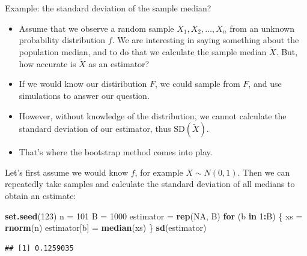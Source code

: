 \documentclass[10pt,ignorenonframetext,]{beamer}
\newenvironment{Shaded}{\begin{snugshade}}{\end{snugshade}}
\newcommand{\KeywordTok}[1]{\textcolor[rgb]{0.13,0.29,0.53}{\textbf{#1}}}
\newcommand{\DecValTok}[1]{\textcolor[rgb]{0.00,0.00,0.81}{#1}}
\newcommand{\StringTok}[1]{\textcolor[rgb]{0.31,0.60,0.02}{#1}}
\newcommand{\OtherTok}[1]{\textcolor[rgb]{0.56,0.35,0.01}{#1}}
\newcommand{\ControlFlowTok}[1]{\textcolor[rgb]{0.13,0.29,0.53}{\textbf{#1}}}
\newcommand{\OperatorTok}[1]{\textcolor[rgb]{0.81,0.36,0.00}{\textbf{#1}}}
\newcommand{\NormalTok}[1]{#1}
\begin{document}
\begin{frame}

\begin{block}{Example: the standard deviation of the sample median?}

\vspace{2mm}

\begin{itemize}
\item
  Assume that we observe a random sample \(X_1, X_2, \ldots, X_n\) from
  an unknown probability distribution \(f\). We are interesting in
  saying something about the population median, and to do that we
  calculate the sample median \(\tilde{X}\). But, how accurate is
  \(\tilde{X}\) as an estimator?
\item
  If we would know our distiribution \(F\), we could sample from \(F\),
  and use simulations to answer our question.
\item
  However, without knowledge of the distribution, we cannot calculate
  the standard deviation of our estimator, thus
  \(\text{SD}(\tilde{X})\).
\item
  That's where the bootstrap method comes into play.
\end{itemize}

\end{block}

\end{frame}

\begin{frame}[fragile]

Let's first assume we would know \(f\), for example \(X\sim N(0,1)\).
Then we can repeatedly take samples and calculate the standard deviation
of all medians to obtain an estimate:

\small

\begin{Shaded}
\begin{Highlighting}[]
\KeywordTok{set.seed}\NormalTok{(}\DecValTok{123}\NormalTok{)}
\NormalTok{n =}\StringTok{ }\DecValTok{101}
\NormalTok{B =}\StringTok{ }\DecValTok{1000}
\NormalTok{estimator =}\StringTok{ }\KeywordTok{rep}\NormalTok{(}\OtherTok{NA}\NormalTok{, B)}
\ControlFlowTok{for}\NormalTok{ (b }\ControlFlowTok{in} \DecValTok{1}\OperatorTok{:}\NormalTok{B) \{}
\NormalTok{    xs =}\StringTok{ }\KeywordTok{rnorm}\NormalTok{(n)}
\NormalTok{    estimator[b] =}\StringTok{ }\KeywordTok{median}\NormalTok{(xs)}
\NormalTok{\}}
\KeywordTok{sd}\NormalTok{(estimator)}
\end{Highlighting}
\end{Shaded}

\begin{verbatim}
## [1] 0.1259035
\end{verbatim}

\end{frame}
\end{document}
